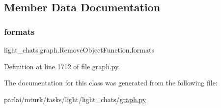 \subsection{Member Data Documentation}
\mbox{\label{classlight__chats_1_1graph_1_1RemoveObjectFunction_a67165948c1e8f963e79aac98baf91509}} 
\subsubsection{\texorpdfstring{formats}{formats}}
{\footnotesize\ttfamily light\+\_\+chats.\+graph.\+Remove\+Object\+Function.\+formats}



Definition at line 1712 of file graph.\+py.



The documentation for this class was generated from the following file\+:\begin{DoxyCompactItemize}
\item 
parlai/mturk/tasks/light/light\+\_\+chats/\hyperlink{parlai_2mturk_2tasks_2light_2light__chats_2graph_8py}{graph.\+py}\end{DoxyCompactItemize}
